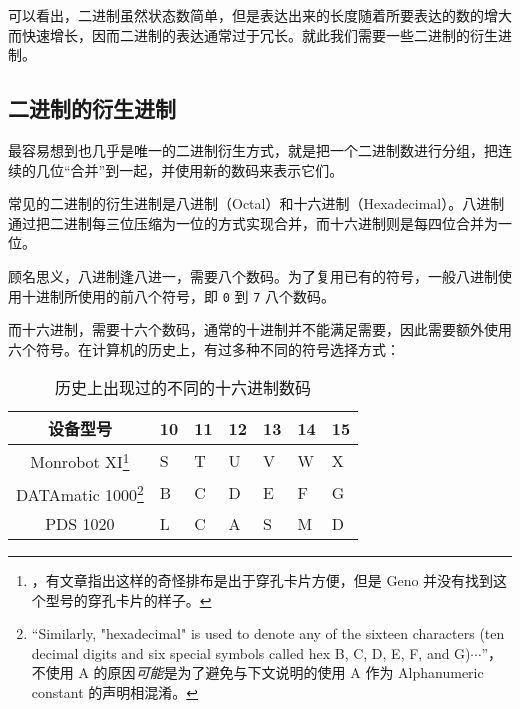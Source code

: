         可以看出，二进制虽然状态数简单，但是表达出来的长度随着所要表达的数的增大而快速增长，因而二进制的表达通常过于冗长。就此我们需要一些二进制的衍生进制。

    \subsection{二进制的衍生进制}\label{subsec:NumberSystemBasics/PositionalNotation/BinaryDerivation}
        最容易想到也几乎是唯一的二进制衍生方式，就是把一个二进制数进行分组，把连续的几位“合并”到一起，并使用新的数码来表示它们。

        常见的二进制的衍生进制是八进制（Octal）和十六进制（Hexadecimal）。八进制通过把二进制每三位压缩为一位的方式实现合并，而十六进制则是每四位合并为一位。

        顾名思义，八进制逢八进一，需要八个数码。为了复用已有的符号，一般八进制使用十进制所使用的前八个符号，即 \texttt{0} 到 \texttt{7} 八个数码。

        而十六进制，需要十六个数码，通常的十进制并不能满足需要，因此需要额外使用六个符号。在计算机的历史上，有过多种不同的符号选择方式：
        \begin{savenotes}
            \begin{table}
                \centering
                \begin{tabular}{|c|l|l|l|l|l|l|}
                    \hline
                    设备型号 & 10 & 11 & 12 & 13 & 14 & 15 \\ \hline
                    Monrobot XI\footnote{\cite[Sexadecimal System]{monrobot-xi-program-manual}，有文章指出这样的奇怪排布是出于穿孔卡片方便\cite{johnmann-monrobot-xi}，但是 Geno 并没有找到这个型号的穿孔卡片的样子。} & S & T & U & V & W & X \\ \hline
                    DATAmatic 1000\footnote{“Similarly, "hexadecimal" is used to denote any of the sixteen characters (ten decimal digits and six special symbols called hex B, C, D, E, F, and G)$\cdots$”\cite[Programmer's Language: Constants]{datamatic-1000-manual-vol-1}，不使用 A 的原因\textit{可能}是为了避免与下文说明的使用 A 作为 Alphanumeric constant 的声明相混淆。} & B & C & D & E & F & G \\ \hline
                    PDS 1020 & L & C & A & S & M & D \\ \hline
                \end{tabular}
                \caption{历史上出现过的不同的十六进制数码}
                \label{tab:NumberSystemBasics/PositionalNotation/BinaryDerivation/HistoricalHexadecimalDigits}
            \end{table}
        \end{savenotes}
